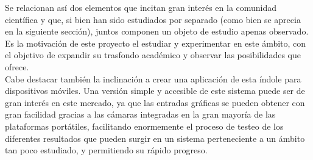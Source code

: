Se relacionan así dos elementos que incitan gran interés en la comunidad científica y que, si bien han sido estudiados por separado (como bien se aprecia en la siguiente sección), juntos componen un objeto de estudio apenas observado. Es la motivación de este proyecto el estudiar y experimentar en este ámbito, con el objetivo de expandir su trasfondo académico y observar las posibilidades que ofrece.\\

Cabe destacar también la inclinación a crear una aplicación de esta índole para dispositivos móviles. Una versión simple y accesible de este sistema puede ser de gran interés en este mercado, ya que las entradas gráficas se pueden obtener con gran facilidad gracias a las cámaras integradas en la gran mayoría de las plataformas portátiles, facilitando enormemente el proceso de testeo de los diferentes resultados que pueden surgir en un sistema perteneciente a un ámbito tan poco estudiado, y permitiendo su rápido progreso.